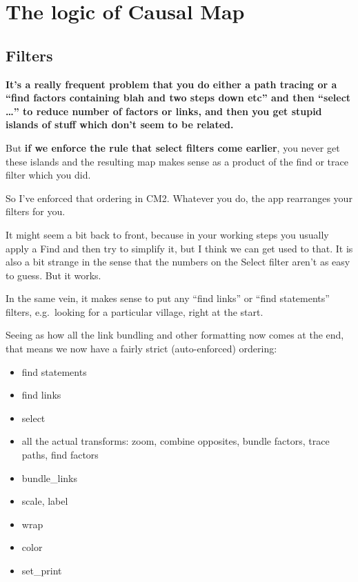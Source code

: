 \documentclass[
]{book}
\providecommand{\tightlist}{%
  \setlength{\itemsep}{0pt}\setlength{\parskip}{0pt}}
\begin{document}
\hypertarget{the-logic-of-causal-map}{%
\chapter{The logic of Causal Map}\label{the-logic-of-causal-map}}

\hypertarget{filters}{%
\section{Filters}\label{filters}}

\textbf{It's a really frequent problem that you do either a path tracing or a ``find factors containing blah and two steps down etc'' and then ``select \ldots{}'' to reduce number of factors or links, and then you get stupid islands of stuff which don't seem to be related.}

But \textbf{if we enforce the rule that select filters come earlier}, you never get these islands and the resulting map makes sense as a product of the find or trace filter which you did.

So I've enforced that ordering in CM2. Whatever you do, the app rearranges your filters for you.

It might seem a bit back to front, because in your working steps you usually apply a Find and then try to simplify it, but I think we can get used to that. It is also a bit strange in the sense that the numbers on the Select filter aren't as easy to guess. But it works.

In the same vein, it makes sense to put any ``find links'' or ``find statements'' filters, e.g.~looking for a particular village, right at the start.

Seeing as how all the link bundling and other formatting now comes at the end, that means we now have a fairly strict (auto-enforced) ordering:

\begin{itemize}
\tightlist
\item
  find statements
\item
  find links
\item
  select
\item
  all the actual transforms: zoom, combine opposites, bundle factors, trace paths, find factors
\item
  bundle\_links
\item
  scale, label
\item
  wrap
\item
  color
\item
  set\_print
\end{itemize}
\end{document}
